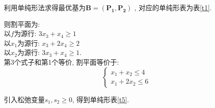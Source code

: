 \documentclass[11pt,AutoFakeBold]{article}
\begin{document}
\begin{enumerate}
利用单纯形法求得最优基为$\mathbf{B}=(\mathbf{P_1},\mathbf{P_2})$ ,
对应的单纯形表为表\ref{t1}.
 \begin{table}[!htbp]
 \centering
 \caption{第四题(2)单纯形表1}
 \label{t4}
 \end{table}
则割平面为:\\
以$f$为源行: $3x_3+x_4\geqslant 1$\\
以$x_1$为源行: $x_3+2x_4\geqslant 2$ \\
以$x_2$为源行: $3x_3+x_4\geqslant 1$.\\
第3个式子和第1个等价, 割平面等价于:
$$\left\{\begin{array}{l}
        x_1+x_2\leqslant 4 \\ x_1+2x_2\leqslant 6               
\end{array}\right.$$

引入松弛变量$s_1,s_2\geqslant 0$, 得到单纯形表\ref{t5}.
 \begin{table}[!htbp]
 \centering
 \caption{第四题(2)单纯形表2}
 \label{t5}
 \end{table}


\end{enumerate}
\end{document}
